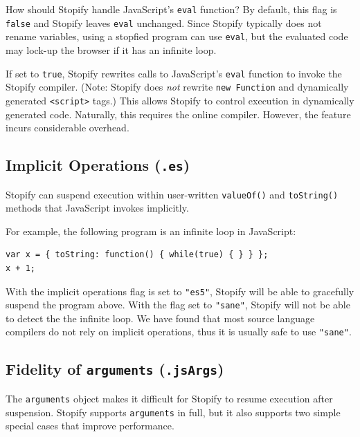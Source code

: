 \documentclass[10pt]{book}
\begin{document}
How should Stopify handle JavaScript's \lstinline|eval| function? By default,
this flag is \lstinline|false| and Stopify leaves \lstinline|eval| unchanged.
Since Stopify typically does not rename variables, using a stopfied program can
use \lstinline|eval|, but the evaluated code may lock-up the browser if it has
an infinite loop.

If set to \lstinline|true|, Stopify rewrites calls to JavaScript's
\lstinline|eval| function to invoke the Stopify compiler. (Note: Stopify does
\emph{not} rewrite \lstinline|new Function| and dynamically generated
\texttt{<script>} tags.) This allows Stopify to control execution in
dynamically generated code. Naturally, this requires the online compiler.
However, the feature incurs considerable overhead.


\subsection{Implicit Operations (\texttt{.es})\label{implicit-ops-flag}}

Stopify can suspend execution within user-written \lstinline|valueOf()| and
\lstinline|toString()| methods that JavaScript invokes implicitly.

For example, the following program is an infinite loop in JavaScript:

\begin{lstlisting}
var x = { toString: function() { while(true) { } } };
x + 1;
\end{lstlisting}

With the implicit operations flag is set to \lstinline|"es5"|, Stopify will be
able to gracefully suspend the program above. With the flag set to \lstinline|"sane"|,
Stopify will not be able to detect the the infinite loop. We have found that
most source language compilers do not rely on implicit operations, thus it is
usually safe to use \lstinline|"sane"|.

\subsection{Fidelity of \texttt{arguments} (\texttt{.jsArgs})\label{arguments-flag}}

The \lstinline|arguments| object makes it difficult for Stopify to resume
execution after suspension. Stopify supports \lstinline|arguments| in full, but
it also supports two simple special cases that improve performance.
\end{document}
